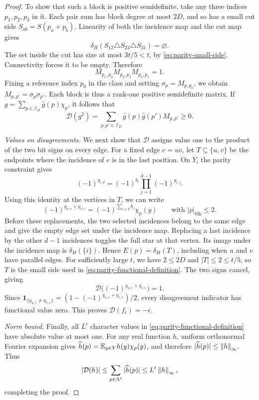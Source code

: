 \begin{proof}
  To show that such a block is positive semidefinite, take any three
  indices \(p_1,p_2,p_3\) in it.  Each pair sum has block degree at most
  \(2D\), and so has a small cut side
  \(S_{ab}=S(p_a+p_b)\).  Linearity of both the incidence map and the cut
  map gives
  \[
    \delta_H(S_{12}\triangle S_{23}\triangle S_{31})=\varnothing.
  \]
  The set inside the cut has size at most \(3t/5<t\), by
  \eqref{eq:parity-small-side}.  Connectivity forces it to be empty.
  Therefore
  \[
    M_{p_1,p_2}M_{p_2,p_3}M_{p_3,p_1}=1.
  \]
  Fixing a reference index \(p_0\) in the class and setting
  \(\sigma_p=M_{p,p_0}\), we obtain
  \(M_{p,p'}=\sigma_p\sigma_{p'}\).  Each block is thus a rank-one
  positive semidefinite matrix.  If
  \(g=\sum_{p\in\mathcal I_D}\widehat g(p)\chi_p\), it follows that
  \[
    \mathcal D(g^2)=
      \sum_{p,p'\in\mathcal I_D}\widehat g(p)\widehat g(p')M_{p,p'}
      \geq0.
  \]

  \emph{Values on disagreements.}
  We next show that \(\mathcal D\) assigns value one to the product of
  the two bit signs on every edge.  For a fixed edge \(e=uv\), let
  \(T\subseteq\{u,v\}\) be the endpoints where the incidence of \(e\)
  is in the last position.  On \(Y_i\) the parity constraint gives
  \[
    (-1)^{y_{i,d}}=(-1)^{b_i}
                        \prod_{j=1}^{d-1}(-1)^{y_{i,j}}.
  \]
  Using this identity at the vertices in \(T\), we can write
  \[
    (-1)^{y_{u,e}+y_{v,e}}
       =(-1)^{\sum_{i\in T}b_i}\chi_p(y)
       \qquad\text{with }|p|_{\mathrm{blk}}\leq2.
  \]
  Before these replacements, the two selected incidences belong to the
  same edge and give the empty edge set under the incidence map.
  Replacing a last incidence by the other \(d-1\) incidences toggles the
  full star at that vertex.  Its image under the incidence map is
  \(\delta_H(\{i\})\).  Hence \(E(p)=\delta_H(T)\), including when
  \(u\) and \(v\) have parallel edges.  For sufficiently large \(t\),
  we have \(2\leq2D\) and \(|T|\leq2\leq t/5\), so \(T\) is the
  small side used in \eqref{eq:parity-functional-definition}.
  The two signs cancel, giving
  \[
    \mathcal D\bigl((-1)^{y_{u,e}+y_{v,e}}\bigr)=1.
  \]
  Since
  \(\mathbf1_{\{y_{u,e}\ne y_{v,e}\}}
       =(1-(-1)^{y_{u,e}+y_{v,e}})/2\), every disagreement indicator
  has functional value zero.  This proves
  \(\mathcal D(f_\epsilon)=-\epsilon\).

  \emph{Norm bound.}
  Finally, all \(L^t\) character values in
  \eqref{eq:parity-functional-definition} have absolute value at most
  one.  For any real function \(h\), uniform orthonormal Fourier
  expansion gives
  \(\widehat h(p)=\mathbb E_{y\in Y}h(y)\chi_p(y)\), and therefore
  \(|\widehat h(p)|\leq\left\lVert h\right\rVert_\infty\).  Thus
  \[
    |\mathcal D(h)|
      \leq\sum_{p\in\Lambda^t}|\widehat h(p)|
      \leq L^t\left\lVert h\right\rVert_\infty,
  \]
  completing the proof.
\end{proof}
